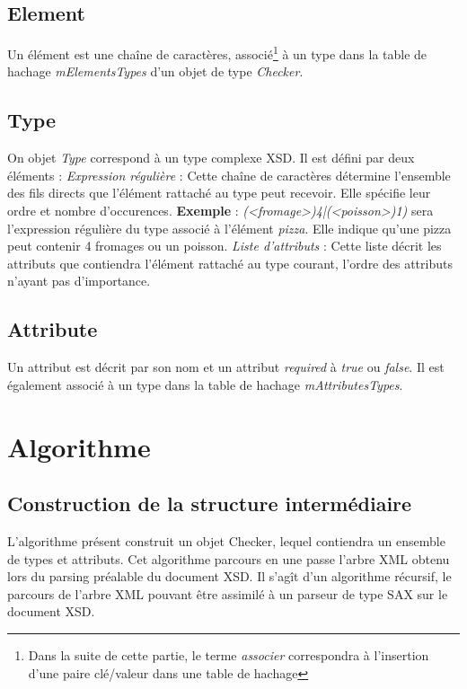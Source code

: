 	\subsection{Element}
		Un élément est une chaîne de caractères, associé\footnote{Dans la suite de cette partie, le terme \textit{associer} correspondra à l'insertion d'une paire clé/valeur dans une table de hachage} à un type dans la table de hachage \textit{mElementsTypes} d'un objet de type \textit{Checker}.

	\subsection{Type}
		On objet \textit{Type} correspond à un type complexe XSD. Il est défini par deux éléments :
		\textit{Expression régulière} : Cette chaîne de caractères détermine l'ensemble des fils directs que l'élément rattaché au type peut recevoir. Elle spécifie leur ordre et nombre d'occurences.
			\textbf{Exemple} : \textit{(<fromage>){4}|(<poisson>){1})} sera l'expression régulière du type associé à l'élément \textit{pizza}.
			Elle indique qu'une pizza peut contenir 4 fromages ou un poisson.
		\textit{Liste d'attributs} : Cette liste décrit les attributs que contiendra l'élément rattaché au type courant, l'ordre des attributs n'ayant pas d'importance.

	\subsection{Attribute}
		Un attribut est décrit par son nom et un attribut \textit{required} à \textit{true} ou \textit{false}. Il est également associé à un type dans la table de hachage \textit{mAttributesTypes}.

\section{Algorithme}

\subsection{Construction de la structure intermédiaire}
L'algorithme présent construit un objet Checker, lequel contiendra un ensemble de types et attributs.
Cet algorithme parcours en une passe l'arbre XML obtenu lors du parsing préalable du document XSD.
Il s'agît d'un algorithme récursif, le parcours de l'arbre XML pouvant être assimilé à un parseur de type SAX sur le document XSD.

